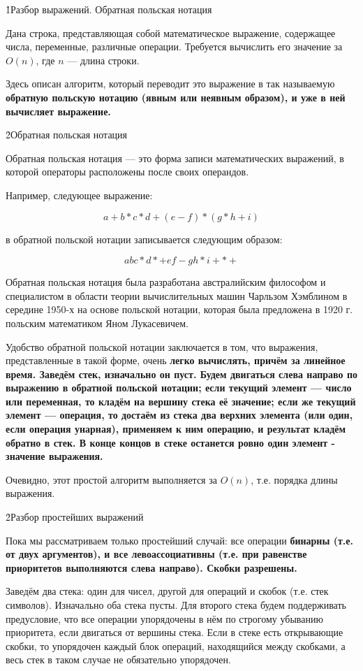 \h1{Разбор выражений. Обратная польская нотация}

Дана строка, представляющая собой математическое выражение, содержащее числа, переменные, различные операции. Требуется вычислить его значение за $O (n)$, где $n$ --- длина строки.

Здесь описан алгоритм, который переводит это выражение в так называемую \bf{обратную польскую нотацию} (явным или неявным образом), и уже в ней вычисляет выражение.


\h2{Обратная польская нотация}

Обратная польская нотация --- это форма записи математических выражений, в которой операторы расположены после своих операндов.

Например, следующее выражение:

$$ a + b * c * d + (e - f) * (g * h + i) $$

в обратной польской нотации записывается следующим образом:

$$ a b c * d * + e f - g h * i + * + $$

Обратная польская нотация была разработана австралийским философом и специалистом в области теории вычислительных машин Чарльзом Хэмблином в середине 1950-х на основе польской нотации, которая была предложена в 1920 г. польским математиком Яном Лукасевичем.

Удобство обратной польской нотации заключается в том, что выражения, представленные в такой форме, очень \bf{легко вычислять}, причём за линейное время. Заведём стек, изначально он пуст. Будем двигаться слева направо по выражению в обратной польской нотации; если текущий элемент --- число или переменная, то кладём на вершину стека её значение; если же текущий элемент --- операция, то достаём из стека два верхних элемента (или один, если операция унарная), применяем к ним операцию, и результат кладём обратно в стек. В конце концов в стеке останется ровно один элемент - значение выражения.

Очевидно, этот простой алгоритм выполняется за $O (n)$, т.е. порядка длины выражения.


\h2{Разбор простейших выражений}

Пока мы рассматриваем только простейший случай: все операции \bf{бинарны} (т.е. от двух аргументов), и все \bf{левоассоциативны} (т.е. при равенстве приоритетов выполняются слева направо). Скобки разрешены.

Заведём два стека: один для чисел, другой для операций и скобок (т.е. стек символов). Изначально оба стека пусты. Для второго стека будем поддерживать предусловие, что все операции упорядочены в нём по строгому убыванию приоритета, если двигаться от вершины стека. Если в стеке есть открывающие скобки, то упорядочен каждый блок операций, находящийся между скобками, а весь стек в таком случае не обязательно упорядочен.

